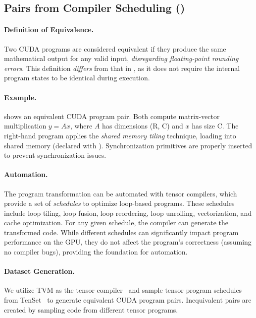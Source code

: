 \subsection{Pairs from Compiler Scheduling (\cuda)}
\label{subsec:cuda}

\paragraph{Definition of Equivalence.} Two CUDA programs are considered equivalent if they produce the same mathematical output for any valid input, \emph{disregarding floating-point rounding errors}. This definition \emph{differs} from that in , as it does not require the internal program states to be identical during execution.

\paragraph{Example.}  shows an equivalent CUDA program pair. Both compute matrix-vector multiplication  $y=Ax$, where $A$ has dimensions (R, C) and $x$ has size C. The right-hand program applies the \emph{shared memory tiling} technique, loading  into shared memory  (declared with ). Synchronization primitives  are properly inserted to prevent synchronization issues.

\paragraph{Automation.} The program transformation can be automated with tensor compilers, which provide a set of \emph{schedules} to optimize loop-based programs. These schedules include loop tiling, loop fusion, loop reordering, loop unrolling, vectorization, and cache optimization. For any given schedule, the compiler can generate the transformed code. While different schedules can significantly impact program performance on the GPU, they do not affect the program's correctness (assuming no compiler bugs), providing the foundation for automation.

\paragraph{Dataset Generation.} We utilize TVM as the tensor compiler~\cite{chen2018tvm} and sample tensor program schedules from TenSet~\cite{zheng2021tenset} to generate equivalent CUDA program pairs. Inequivalent pairs are created by sampling code from different tensor programs.


